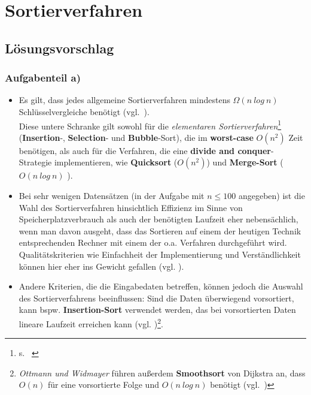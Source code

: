 \chapter{Sortierverfahren}

\section{Lösungsvorschlag}

\subsection{Aufgabenteil a)}

\begin{itemize}
    \item Es gilt, dass jedes allgemeine Sortierverfahren mindestens $\Omega(n\ log\ n)$ Schlüsselvergleiche benötigt (vgl.~\cite[154]{OW17b}).\\
    Diese untere Schranke gilt sowohl für die \textit{elementaren Sortierverfahren}\footnote{s. ~\cite[81]{OW17b}}  (\textbf{Insertion}-,
    \textbf{Selection}- und \textbf{Bubble}-Sort), die im \textbf{worst-case} $O(n^2)$ Zeit benötigen, als auch für die
    Verfahren, die eine \textbf{divide and conquer}-Strategie implementieren, wie \textbf{Quicksort} ($O(n^2)$)
    und \textbf{Merge-Sort} ($O(n\ log\ n)$ ).

    \item Bei sehr wenigen Datensätzen (in der Aufgabe mit $n \leq 100$ angegeben) ist die Wahl des Sortierverfahren
    hinsichtlich Effizienz im Sinne von Speicherplatzverbrauch als auch der benötigten Laufzeit eher nebensächlich, wenn man davon ausgeht,
    dass das Sortieren auf einem der heutigen Technik entsprechenden Rechner mit einem der o.a. Verfahren durchgeführt wird.\\
    Qualitätskriterien wie Einfachheit der Implementierung und Verständlichkeit können hier eher ins Gewicht gefallen (vgl. \cite[5 f.]{GD18a}).

    \item Andere Kriterien, die die Eingabedaten betreffen, können jedoch die Auswahl des Sortierverfahrens beeinflussen: Sind die Daten überwiegend
    vorsortiert, kann bspw. \textbf{Insertion-Sort} verwendet werden, das bei vorsortierten Daten lineare Laufzeit erreichen kann (vgl. \cite[188]{CL22})\footnote{
        \textit{Ottmann und Widmayer} führen außerdem \textbf{Smoothsort} von Dijkstra an, dass $O(n)$ für eine vorsortierte Folge und $O(n\ log\ n)$ benötigt (vgl.~\cite[112]{OW17b})
        }.


\end{itemize}
